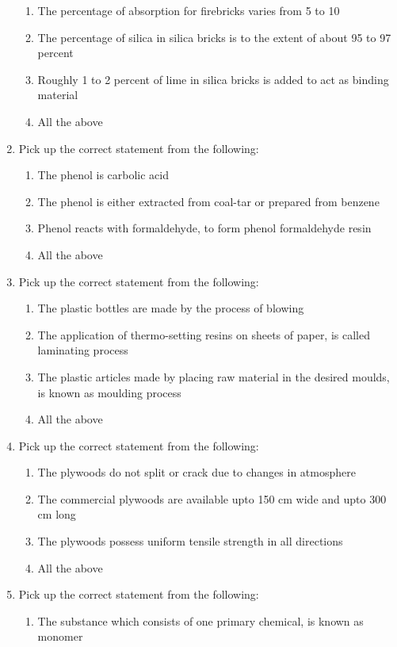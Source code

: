 \documentclass[11pt,a4paper]{article}
\begin{document}
\begin{enumerate}
\begin{enumerate}[label=\Alph*.]
\item{The percentage of absorption for firebricks varies from 5 to 10}
\item{The percentage of silica in silica bricks is to the extent of about 95 to 97 percent}
\item{Roughly 1 to 2 percent of lime in silica bricks is added to act as binding material}
\item{All the above}
\end{enumerate}
\item{Pick up the correct statement from the following:}
\begin{enumerate}[label=\Alph*.]
\item{The phenol is carbolic acid}
\item{The phenol is either extracted from coal-tar or prepared from benzene}
\item{Phenol reacts with formaldehyde, to form phenol formaldehyde resin}
\item{All the above}
\end{enumerate}
\item{Pick up the correct statement from the following:}
\begin{enumerate}[label=\Alph*.]
\item{The plastic bottles are made by the process of blowing}
\item{The application of thermo-setting resins on sheets of paper, is called laminating process}
\item{The plastic articles made by placing raw material in the desired moulds, is known as moulding process}
\item{All the above}
\end{enumerate}
\item{Pick up the correct statement from the following:}
\begin{enumerate}[label=\Alph*.]
\item{The plywoods do not split or crack due to changes in atmosphere}
\item{The commercial plywoods are available upto 150 cm wide and upto 300 cm long}
\item{The plywoods possess uniform tensile strength in all directions}
\item{All the above}
\end{enumerate}
\item{Pick up the correct statement from the following:}
\begin{enumerate}[label=\Alph*.]
\item{The substance which consists of one primary chemical, is known as monomer}

\end{enumerate}
\end{enumerate}
\end{document}

